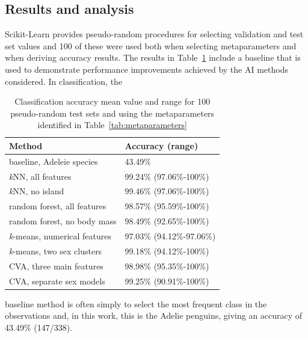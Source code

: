 \documentclass[12pt]{article}
\begin{document}
\subsection*{Results and analysis}
Scikit-Learn provides pseudo-random procedures for selecting validation and test set values and 100 of these were used 
both when selecting metaparameters and when deriving accuracy results.
The results in Table~\ref{tab:results} include a baseline that is used to demonstrate 
performance improvements achieved by the AI methods considered. In classification, the
\begin{table} %
  \small
  \begin{center}
  \vspace{-3\baselineskip} %
  \setlength{\abovecaptionskip}{5pt}
  \setlength{\belowcaptionskip}{5pt}
  \fontsize{10}{10}\selectfont %
  \begin{tabular}{l|l}
  \textbf{Method} & \textbf{Accuracy (range)}\\
  \hline
  baseline, Adeleie species & 43.49\% \\
  \hline
  \textit{k}NN, all features & 99.24\% (97.06\%-100\%)\\
  \textit{k}NN, no island &	99.46\% (97.06\%-100\%)\\
  \hline
  random forest, all features	& 98.57\% (95.59\%-100\%)\\
  random forest, no body mass & 98.49\% (92.65\%-100\%)\\
  \hline
  \textit{k}-means, numerical features & 97.03\% (94.12\%-97.06\%)\\
  \textit{k}-means, two sex clusters  & 99.18\% (94.12\%-100\%)\\
  \hline
  CVA, three main features & 98.98\% (95.35\%-100\%)\\
  CVA, separate sex models & 99.25\% (90.91\%-100\%)\\
  \hline
  \end{tabular}
  \vspace{-2\baselineskip} %
  \end{center} 
  \caption{\centering\linespread{0.8}\selectfont Classification accuracy mean value and range for 100 pseudo-random test sets 
  and using the metaparameters identified in Table~\ref{tab:metaparameters}}
  \vspace{-0.5\baselineskip} %
  \label{tab:results}
\end{table} 
baseline method is often simply to select the most frequent class in the observations and, 
in this work, this is the Adelie penguins, giving an accuracy of 43.49\% (147/338).
\end{document}
